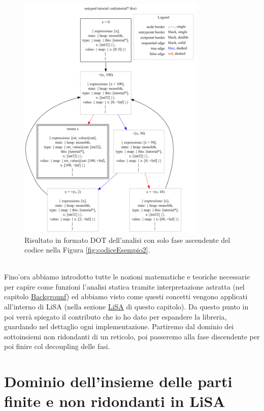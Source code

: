 \begin{figure}[ht]
	\centering
	\includegraphics[width=0.8\textwidth]{Immagini/graphviz.png}
	\caption{Risultato in formato DOT dell'analisi con solo fase ascendente del codice nella Figura \ref{fig:codiceEsempio2}.}
	\label{fig:risultatoDOTAsc}
\end{figure}
\\

Fino'ora abbiamo introdotto tutte le nozioni matematiche e teoriche necessarie per capire come funzioni l'analisi statica tramite interpretazione astratta (nel capitolo \hyperref[chapter:background]{Backgrounf}) ed abbiamo visto come questi concetti vengono applicati all'interno di LiSA (nella sezione \hyperref[sec:LiSA]{LiSA} di questo capitolo). Da questo punto in poi verrà spiegato il contributo che io ho dato per espandere la libreria, guardando nel dettaglio ogni implementazione. Partiremo dal dominio dei sottoinsiemi non ridondanti di un reticolo, poi passeremo alla fase discendente per poi finire col decoupling delle fasi.

\section{Dominio dell'insieme delle parti finite e non ridondanti in LiSA}

